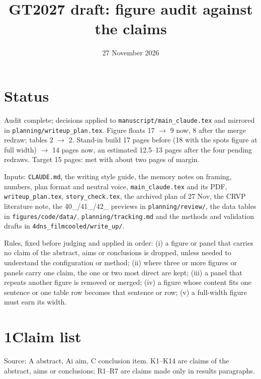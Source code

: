 \documentclass[10pt]{article}
\title{GT2027 draft: figure audit against the claims}
\author{}
\date{27 November 2026}
\begin{document}
\maketitle
\vspace{-12mm}

\section*{Status}
Audit complete; decisions applied to \texttt{manuscript/main\_claude.tex} and mirrored in
\texttt{planning/writeup\_plan.tex}. Figure floats 17 $\rightarrow$ 9 now, 8 after the merge redraw; tables 2
$\rightarrow$ 2. Stand-in build 17 pages before (18 with the spots figure at full width) $\rightarrow$ 14 pages now,
an estimated 12.5--13 pages after the four pending redraws. Target 15 pages: met with about two pages of margin.

Inputs: \texttt{CLAUDE.md}, the writing style guide, the memory notes on framing, numbers, plan format and neutral
voice, \texttt{main\_claude.tex} and its PDF, \texttt{writeup\_plan.tex}, \texttt{story\_check.tex}, the archived plan
of 27 Nov, the CRVP literature note, the 40\_/41\_/42\_ previews in \texttt{planning/review/}, the data tables in
\texttt{figures/code/data/}, \texttt{planning/tracking.md} and the methods and validation drafts in
\texttt{4dns\_filmcooled/write\_up/}.

Rules, fixed before judging and applied in order: (i) a figure or panel that carries no claim of the abstract, aims or
conclusions is dropped, unless needed to understand the configuration or method; (ii) where three or more figures or
panels carry one claim, the one or two most direct are kept; (iii) a panel that repeats another figure is removed or
merged; (iv) a figure whose content fits one sentence or one table row becomes that sentence or row; (v) a
full-width figure must earn its width.

\section*{1\quad Claim list}
Source: A abstract, Ai aim, C conclusion item. K1--K14 are claims of the abstract, aims or conclusions; R1--R7 are
claims made only in results paragraphs.
\end{document}
